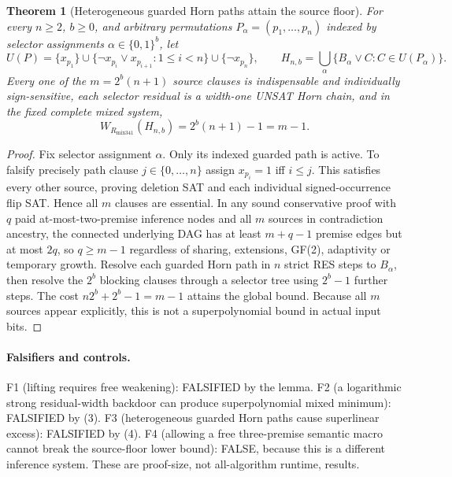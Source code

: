 \documentclass[11pt]{article}
\newtheorem{theorem}{Theorem}
\begin{document}
\begin{theorem}[Heterogeneous guarded Horn paths attain the source floor]
For every $n\ge2$, $b\ge0$, and arbitrary permutations $P_\alpha=(p_1,\dots,p_n)$ indexed by selector assignments $\alpha\in\{0,1\}^b$, let
\[
U(P)=\{x_{p_1}\}\cup\{\neg x_{p_i}\vee x_{p_{i+1}}:1\le i<n\}\cup\{\neg x_{p_n}\},
\qquad H_{n,b}=\bigcup_\alpha\{B_\alpha\vee C:C\in U(P_\alpha)\}.
\]
Every one of the $m=2^b(n+1)$ source clauses is indispensable and individually sign-sensitive, each selector residual is a width-one UNSAT Horn chain, and in the fixed complete mixed system,
\[
\boxed{W_{R_{\mathrm{mix341}}}(H_{n,b})=2^b(n+1)-1=m-1.}\tag{4}
\]
\end{theorem}
\begin{proof}
Fix selector assignment $\alpha$. Only its indexed guarded path is active. To falsify precisely path clause $j\in\{0,\ldots,n\}$ assign $x_{p_i}=1$ iff $i\le j$. This satisfies every other source, proving deletion SAT and each individual signed-occurrence flip SAT. Hence all $m$ clauses are essential. In any sound conservative proof with $q$ paid at-most-two-premise inference nodes and all $m$ sources in contradiction ancestry, the connected underlying DAG has at least $m+q-1$ premise edges but at most $2q$, so $q\ge m-1$ regardless of sharing, extensions, GF(2), adaptivity or temporary growth. Resolve each guarded Horn path in $n$ strict RES steps to $B_\alpha$, then resolve the $2^b$ blocking clauses through a selector tree using $2^b-1$ further steps. The cost $n2^b+2^b-1=m-1$ attains the global bound. Because all $m$ sources appear explicitly, this is not a superpolynomial bound in actual input bits.
\end{proof}

\paragraph{Falsifiers and controls.}
F1 (lifting requires free weakening): FALSIFIED by the lemma. F2 (a logarithmic strong residual-width backdoor can produce superpolynomial mixed minimum): FALSIFIED by (3). F3 (heterogeneous guarded Horn paths cause superlinear excess): FALSIFIED by (4). F4 (allowing a free three-premise semantic macro cannot break the source-floor lower bound): FALSE, because this is a different inference system. These are proof-size, not all-algorithm runtime, results.
\end{document}
